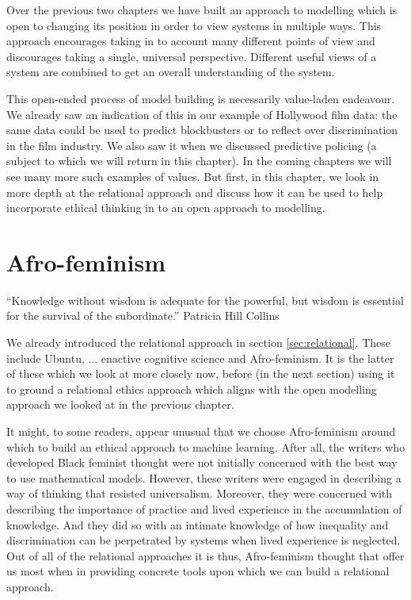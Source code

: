 
Over the previous two chapters we have built an approach to modelling which is open to changing its position in order to view systems in multiple ways. This approach encourages taking in to account many different points of view and discourages taking a single, universal perspective. Different useful views of a system are combined to get an overall understanding of the system.

This open-ended process of model building is necessarily value-laden endeavour.  We already saw an indication of this in our example of Hollywood film data: the same data could be used to predict blockbusters or to reflect over discrimination in the film industry. We also saw it when we discussed predictive policing (a subject to which we will return in this chapter). In the coming chapters we will see many more such examples of values. But first, in this chapter, we look in more depth at the relational approach and discuss how it can be used to help incorporate ethical thinking in to an open approach to modelling. 

\section{Afro-feminism} 

\label{sec:Afro-feminism}
\begin{displayquote}
``Knowledge without wisdom is adequate for the powerful, but wisdom is essential for the survival of the subordinate.'' Patricia Hill Collins \cite{collins2002black} \\
\end{displayquote}

We already introduced the relational approach in section \ref{sec:relational}. These include Ubuntu, ... enactive cognitive science and Afro-feminism. It is the latter of these which we look at more closely now, before (in the next section) using it to ground a relational ethics approach which aligns with the open modelling approach we looked at in the previous chapter.

It might, to some readers, appear unusual that we choose Afro-feminism around which to build an ethical approach to machine learning. After all, the writers who developed Black feminist thought were not initially concerned with the best way to use mathematical models. However, these writers were engaged in describing a way of thinking that resisted universalism. Moreover, they were concerned with describing the importance of practice and lived experience in the accumulation of knowledge. And they did so with an intimate knowledge of how inequality and discrimination can be perpetrated by systems when lived experience is neglected. Out of all of the relational approaches it is thus, Afro-feminism thought that offer us most when in providing concrete tools upon which we can build a relational approach. 

